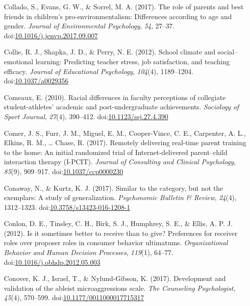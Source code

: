 \documentclass[english,man]{apa6}
\theoremstyle{definition}
\theoremstyle{definition}
\theoremstyle{definition}
\theoremstyle{remark}
\begin{document}
\hypertarget{ref-Collado2017}{}
Collado, S., Evans, G. W., \& Sorrel, M. A. (2017). The role of parents
and best friends in children's pro-environmentalism: Differences
according to age and gender. \emph{Journal of Environmental Psychology},
\emph{54}, 27--37.
doi:\href{https://doi.org/10.1016/j.jenvp.2017.09.007}{10.1016/j.jenvp.2017.09.007}

\hypertarget{ref-Collie2012}{}
Collie, R. J., Shapka, J. D., \& Perry, N. E. (2012). School climate and
social--emotional learning: Predicting teacher stress, job satisfaction,
and teaching efficacy. \emph{Journal of Educational Psychology},
\emph{104}(4), 1189--1204.
doi:\href{https://doi.org/10.1037/a0029356}{10.1037/a0029356}

\hypertarget{ref-Comeaux2010}{}
Comeaux, E. (2010). Racial differences in faculty perceptions of
collegiate student-athletes' academic and post-undergraduate
achievements. \emph{Sociology of Sport Journal}, \emph{27}(4), 390--412.
doi:\href{https://doi.org/10.1123/ssj.27.4.390}{10.1123/ssj.27.4.390}

\hypertarget{ref-Comer2017a}{}
Comer, J. S., Furr, J. M., Miguel, E. M., Cooper-Vince, C. E.,
Carpenter, A. L., Elkins, R. M., \ldots{} Chase, R. (2017). Remotely
delivering real-time parent training to the home: An initial randomized
trial of Internet-delivered parent--child interaction therapy (I-PCIT).
\emph{Journal of Consulting and Clinical Psychology}, \emph{85}(9),
909--917.
doi:\href{https://doi.org/10.1037/ccp0000230}{10.1037/ccp0000230}

\hypertarget{ref-Conaway2016}{}
Conaway, N., \& Kurtz, K. J. (2017). Similar to the category, but not
the exemplars: A study of generalization. \emph{Psychonomic Bulletin \&
Review}, \emph{24}(4), 1312--1323.
doi:\href{https://doi.org/10.3758/s13423-016-1208-1}{10.3758/s13423-016-1208-1}

\hypertarget{ref-Conlon2012}{}
Conlon, D. E., Tinsley, C. H., Birk, S. J., Humphrey, S. E., \& Ellis,
A. P. J. (2012). Is it sometimes better to receive than to give?
Preferences for receiver roles over proposer roles in consumer behavior
ultimatums. \emph{Organizational Behavior and Human Decision Processes},
\emph{119}(1), 64--77.
doi:\href{https://doi.org/10.1016/j.obhdp.2012.05.003}{10.1016/j.obhdp.2012.05.003}

\hypertarget{ref-Conover2017}{}
Conover, K. J., Israel, T., \& Nylund-Gibson, K. (2017). Development and
validation of the ableist microaggressions scale. \emph{The Counseling
Psychologist}, \emph{45}(4), 570--599.
doi:\href{https://doi.org/10.1177/0011000017715317}{10.1177/0011000017715317}
\end{document}
